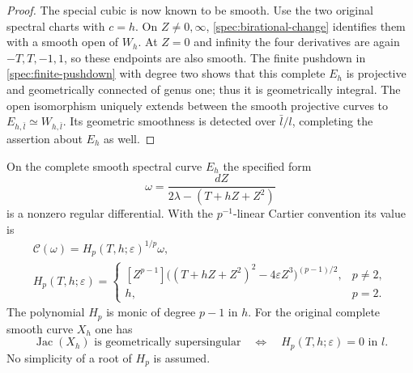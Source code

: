 \begin{proof}
The special cubic is now known to be smooth.  Use the two original
spectral charts with $c=h$.  On $Z\ne0,\infty$,
\eqref{spec:birational-change} identifies them with a smooth open
of $W_h$.  At $Z=0$ and infinity the four derivatives are again
$-T,T,-1,1$, so these endpoints are also smooth.
The finite pushdown in \eqref{spec:finite-pushdown} with degree two
shows that this complete $E_h$ is projective and geometrically
connected of genus one; thus it is geometrically integral.
The open isomorphism uniquely extends between the smooth
projective curves to $E_{h,\bar l}\simeq W_{h,\bar l}$.
Its geometric smoothness is detected over $\bar l/l$, completing
the assertion about $E_h$ as well.
\end{proof}

\begin{proposition}\label{hasse:cartier}
On the complete smooth spectral curve $E_h$ the specified form
\begin{equation}
\omega=\frac{dZ}{2\lambda-(T+hZ+Z^2)}
\label{hasse:differential}
\end{equation}
is a nonzero regular differential.  With the $p^{-1}$-linear
Cartier convention its value is
\begin{equation}
\begin{gathered}
\mathcal C(\omega)=H_p(T,h;\varepsilon)^{1/p}\omega,\\
H_p(T,h;\varepsilon)=
\begin{cases}
[Z^{p-1}]\bigl((T+hZ+Z^2)^2-4\varepsilon Z^3\bigr)^{(p-1)/2},
 &p\ne2,\\
h,&p=2.
\end{cases}
\end{gathered}
\label{hasse:polynomial}
\end{equation}
The polynomial $H_p$ is monic of degree $p-1$ in $h$.
For the original complete smooth curve $X_h$ one has
\[
\operatorname{Jac}(X_h)\text{ is geometrically supersingular}
\quad\Longleftrightarrow\quad H_p(T,h;\varepsilon)=0\text{ in }l.
\]
No simplicity of a root of $H_p$ is assumed.
\end{proposition}

